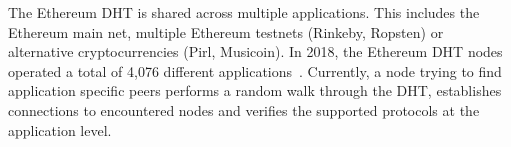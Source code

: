  The Ethereum DHT is shared across multiple applications.  This includes the Ethereum main net, multiple Ethereum testnets (Rinkeby, Ropsten) or alternative cryptocurrencies (Pirl, Musicoin). In 2018, the Ethereum DHT nodes operated a total of 4,076 different applications~\cite{kim2018measuring}. Currently, a node trying to find application specific peers performs a random walk through the DHT, establishes connections to encountered nodes and verifies the supported protocols at the application level. 

